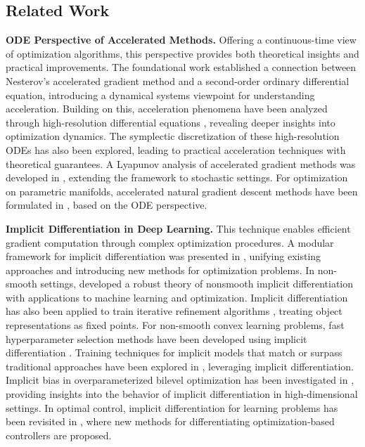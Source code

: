 \documentclass{article}
\begin{document}
\subsection{Related Work}
\label{sec:literature}

\textbf{ODE Perspective of Accelerated Methods.}
Offering a continuous-time view of optimization algorithms, this perspective provides both theoretical insights and practical improvements. The foundational work \cite{su2016differential} established a connection between Nesterov's accelerated gradient method and a second-order ordinary differential equation, introducing a dynamical systems viewpoint for understanding acceleration. Building on this, acceleration phenomena have been analyzed through high-resolution differential equations \cite{shi2022understanding}, revealing deeper insights into optimization dynamics. The symplectic discretization of these high-resolution ODEs \cite{shi2019acceleration} has also been explored, leading to practical acceleration techniques with theoretical guarantees. A Lyapunov analysis of accelerated gradient methods was developed in \cite{laborde2020lyapunov}, extending the framework to stochastic settings. For optimization on parametric manifolds, accelerated natural gradient descent methods have been formulated in \cite{li2025angd}, based on the ODE perspective.

\textbf{Implicit Differentiation in Deep Learning.}
This technique enables efficient gradient computation through complex optimization procedures. A modular framework for implicit differentiation was presented in \cite{blondel2022efficient}, unifying existing approaches and introducing new methods for optimization problems. In non-smooth settings, \cite{bolte2021nonsmooth} developed a robust theory of nonsmooth implicit differentiation with applications to machine learning and optimization. Implicit differentiation has also been applied to train iterative refinement algorithms \cite{chang2022object}, treating object representations as fixed points. For non-smooth convex learning problems, fast hyperparameter selection methods have been developed using implicit differentiation \cite{bertrand2022implicit}. Training techniques for implicit models that match or surpass traditional approaches have been explored in \cite{geng2021training}, leveraging implicit differentiation. Implicit bias in overparameterized bilevel optimization has been investigated in \cite{vicol2022implicit}, providing insights into the behavior of implicit differentiation in high-dimensional settings. In optimal control, implicit differentiation for learning problems has been revisited in \cite{xu2023revisiting}, where new methods for differentiating optimization-based controllers are proposed.
\end{document}
